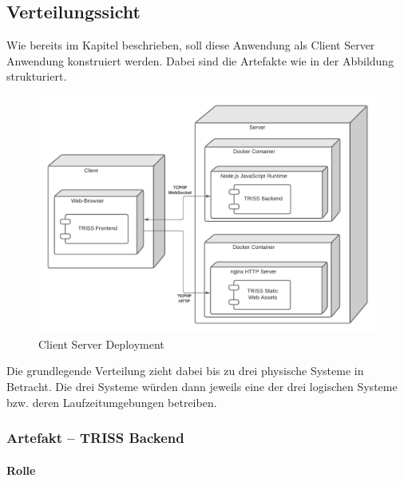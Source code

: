 \subsection{Verteilungssicht}
\label{sec:distribution-view}

Wie bereits im Kapitel  beschrieben, soll diese Anwendung als Client Server Anwendung konstruiert werden.
Dabei sind die Artefakte wie in der Abbildung  strukturiert.

\begin{figure}[htb]
    \centering
    \includegraphics[scale=.65,center]{medien/abstract-client-server.pdf}
    \caption{Client Server Deployment}
    \ownsource
    \label{fig:client-server-deployment}
\end{figure}

\FloatBarrier

Die grundlegende Verteilung zieht dabei bis zu drei physische Systeme in Betracht.
Die drei Systeme würden dann jeweils eine der drei logischen Systeme bzw. deren Laufzeitumgebungen betreiben.

\newcommand{\subsubsubsection}[1]{\paragraph{#1}\mbox{}}

\subsubsection{Artefakt – TRISS Backend}

\subsubsubsection{Rolle}

